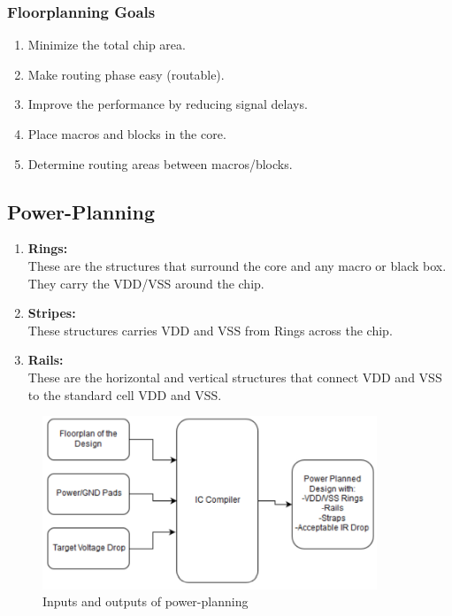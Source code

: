 \documentclass[../main.tex]{subfiles}
\begin{document}
\subsubsection{Floorplanning Goals}
\begin{enumerate}
\item Minimize the total chip area.
\item Make routing phase easy (routable).
\item Improve the performance by reducing signal delays.
\item Place macros and blocks in the core.
\item Determine routing areas between macros/blocks.
\end{enumerate}
\subsection{Power-Planning}

\begin{enumerate}
\item  \textbf{Rings:}\\
These are the structures that surround the core and any macro or black box. They carry the VDD/VSS around the chip.
\item \textbf{Stripes:}\\
These structures carries VDD and VSS from Rings across the chip.
\item \textbf{Rails:}\\
These are the horizontal and vertical structures that connect VDD and VSS to the standard cell VDD and VSS.
\end{enumerate}

\begin{figure}[h]
\centering
\includegraphics[width=10cm]{diagrams/IO_power.PNG}
\caption{ Inputs and outputs of power-planning}
\label{fig:IO_power}
\end{figure}
\end{document}
